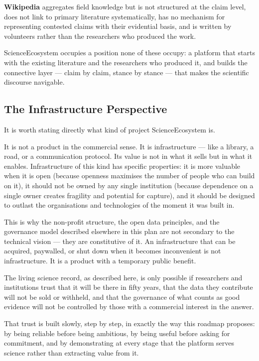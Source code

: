 \textbf{Wikipedia} aggregates field knowledge but is not structured at the
claim level, does not link to primary literature systematically, has no
mechanism for representing contested claims with their evidential basis, and
is written by volunteers rather than the researchers who produced the work.

ScienceEcosystem occupies a position none of these occupy: a platform that
starts with the existing literature and the researchers who produced it, and
builds the connective layer — claim by claim, stance by stance — that makes
the scientific discourse navigable.

\subsection*{The Infrastructure Perspective}

It is worth stating directly what kind of project ScienceEcosystem is.

It is not a product in the commercial sense. It is infrastructure — like a
library, a road, or a communication protocol. Its value is not in what it sells
but in what it enables. Infrastructure of this kind has specific properties:
it is more valuable when it is open (because openness maximises the number of
people who can build on it), it should not be owned by any single institution
(because dependence on a single owner creates fragility and potential for
capture), and it should be designed to outlast the organisations and
technologies of the moment it was built in.

This is why the non-profit structure, the open data principles, and the
governance model described elsewhere in this plan are not secondary to the
technical vision — they are constitutive of it. An infrastructure that can be
acquired, paywalled, or shut down when it becomes inconvenient is not
infrastructure. It is a product with a temporary public benefit.

The living science record, as described here, is only possible if researchers
and institutions trust that it will be there in fifty years, that the data they
contribute will not be sold or withheld, and that the governance of what counts
as good evidence will not be controlled by those with a commercial interest
in the answer.

That trust is built slowly, step by step, in exactly the way this roadmap
proposes: by being reliable before being ambitious, by being useful before
asking for commitment, and by demonstrating at every stage that the platform
serves science rather than extracting value from it.

